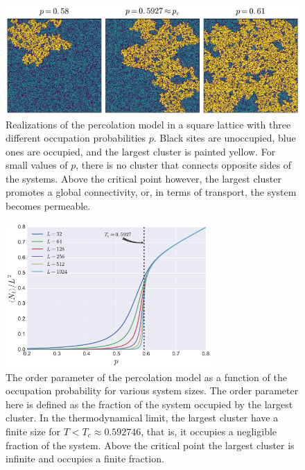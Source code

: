 \begin{figure}
\begin{center}
    \includegraphics[width=\textwidth]{chapters/ch2-crit/figs/isoperco}
\end{center}
\caption{Realizations of the percolation model in a square lattice with three
    different occupation probabilities $p$. Black sites are unoccupied, blue
    ones are occupied, and the largest cluster is painted yellow. For small
    values of $p$, there is no cluster that connects opposite sides of the
    systems. Above the critical point however, the largest cluster promotes a
    global connectivity, or, in terms of transport, the system becomes
    permeable.}
\label{fig:isoperco}
\end{figure}

\begin{figure}
\begin{center}
    \includegraphics[width=0.7\textwidth]{chapters/ch2-crit/figs/isoperco2}
\end{center}
\caption{The order parameter of the percolation model as a function of the
    occupation probability for various system sizes. The order parameter here
    is defined as the fraction of the system occupied by the largest cluster.
    In the thermodynamical limit, the largest cluster have a finite size for
    $T<T_c\approx 0.592746$, that is, it occupies a negligible fraction of the
    system. Above the critical point the largest cluster is infinite and occupies
    a finite fraction.}
\label{fig:isoperco2}
\end{figure}

